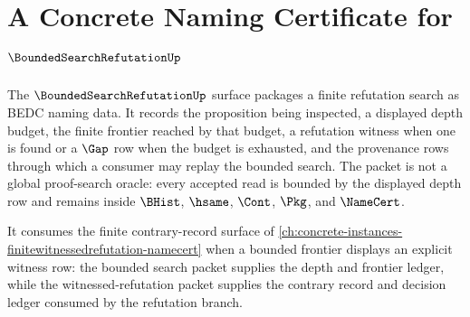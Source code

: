 \chapter{A Concrete Naming Certificate for $\BoundedSearchRefutationUp$}
\label{ch:concrete-instances-boundedsearchrefutation-namecert}

The $\BoundedSearchRefutationUp$ surface packages a finite refutation search as BEDC naming data. It records the proposition being inspected, a displayed depth budget, the finite frontier reached by that budget, a refutation witness when one is found or a $\Gap$ row when the budget is exhausted, and the provenance rows through which a consumer may replay the bounded search. The packet is not a global proof-search oracle: every accepted read is bounded by the displayed depth row and remains inside $\BHist$, $\hsame$, $\Cont$, $\Pkg$, and $\NameCert$.

It consumes the finite contrary-record surface of \autoref{ch:concrete-instances-finitewitnessedrefutation-namecert} when a bounded frontier displays an explicit witness row: the bounded search packet supplies the depth and frontier ledger, while the witnessed-refutation packet supplies the contrary record and decision ledger consumed by the refutation branch.

